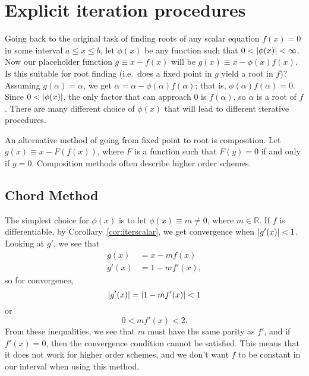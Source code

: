 \documentclass[12pt,letterpaper,DIV=11]{scrartcl}
\theoremstyle{plain}
\theoremstyle{definition}
\theoremstyle{remark}
\begin{document}
\section{Explicit iteration procedures}
Going back to the original task of finding roots of any scalar equation $f(x) = 0$ in some interval $a \leq x \leq b$,
let $\phi(x)$ be any function such that $0 < \left\lvert\phi(x)\right\rvert < \infty$.
Now our placeholder function $g \equiv x - f(x)$ will be $g(x) \equiv x - \phi(x) f(x)$.
Is this suitable for root finding (i.e.\ does a fixed point in $g$ yield a root in $f$)?
Assuming $g(\alpha) = \alpha$, we get $\alpha = \alpha - \phi(\alpha) f(\alpha)$; that is, $\phi(\alpha) f(\alpha) = 0$.
Since $0 < \left\lvert\phi(x)\right\rvert$, the only factor that can approach 0 is $f(\alpha)$, so $\alpha$ is a root of $f$.
There are many different choice of $\phi(x)$ that will lead to different iterative procedures.

An alternative method of going from fixed point to root is composition.
Let $g(x) \equiv x - F(f(x))$, where $F$ is a function such that $F(y) = 0$ if and only if $y = 0$.
Composition methods often describe higher order schemes.

\subsection{Chord Method}
The simplest choice for $\phi(x)$ is to let $\phi(x) \equiv m \neq 0$, where $m \in \mathbb{R}$.
If $f$ is differentiable, by Corollary~\ref{cor:iterscalar}, we get convergence when $\left\lvert g'(x)\right\rvert < 1$.
Looking at $g'$, we see that \begin{align*}
  g(x) &= x - m f(x) \\
  g'(x) &= 1 - m f'(x),
\end{align*}
so for convergence, \begin{equation}
  \left\lvert g'(x)\right\rvert = \left\lvert1 - m f'(x)\right\rvert < 1
\end{equation} or
\begin{equation}\label{eqn:chordconvergence2}
  0 < m f'(x) < 2.
\end{equation}
From these inequalities, we see that $m$ must have the same parity as $f'$, and if $f'(x) = 0$, then the convergence condition cannot be satisfied.
This means that it does not work for higher order schemes, and we don't want $f$ to be constant in our interval when using this method.
\end{document}
